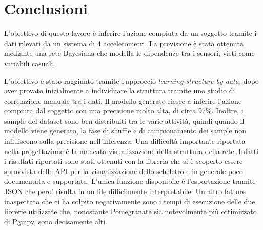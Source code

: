 \documentclass[12pt]{article}
\begin{document}
\section{Conclusioni}
L'obiettivo di questo lavoro è inferire l'azione compiuta da un soggetto tramite i dati rilevati da un sistema di 4 accelerometri. La previsione è stata ottenuta mediante una rete Bayesiana che modella le dipendenze tra i sensori, visti come variabili casuali.\par L'obiettivo è stato raggiunto tramite l'approccio \textit{learning structure by data,} dopo aver provato inizialmente a individuare la struttura tramite uno studio di correlazione manuale tra i dati. Il modello generato riesce a inferire l'azione compiuta dal soggetto con una precisione molto alta, di circa 97\%. Inoltre, i sample del dataset sono ben distribuiti tra le varie attività, quindi quando il modello viene generato, la fase di shuffle e di campionamento dei sample non influiscono sulla precisione nell'inferenza. Una difficoltà importante riportata nella progettazione è la mancata visualizzazione della struttura della rete. Infatti i risultati riportati sono stati ottenuti con la libreria \cite{pomegranate} che si è scoperto essere sprovvista delle API per la visualizzazione dello scheletro e in generale poco documentata e supportata. L'unica funzione disponibile è l'esportazione tramite JSON che pero' risulta in un file difficilmente interpretabile.\newline
Un altro fattore inaspettato che ci ha colpito negativamente sono i tempi di esecuzione delle due librerie utilizzate che, nonostante Pomegranate sia notevolmente più ottimizzato di Pgmpy, sono decisamente alti.
\newpage


\end{document}
